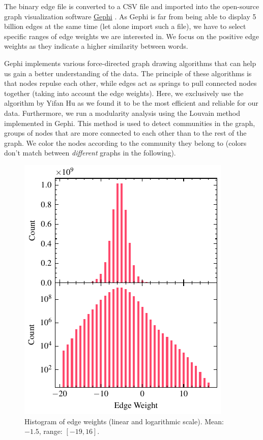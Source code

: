 The binary edge file is converted to a CSV file and imported into the open-source graph visualization software \href{https://gephi.org/}{Gephi} \cite{tools_gephi}. As Gephi is far from being able to display 5 billion edges at the same time (let alone import such a file), we have to select specific ranges of edge weights we are interested in. We focus on the positive edge weights as they indicate a higher similarity between words.

Gephi implements various force-directed graph drawing algorithms that can help us gain a better understanding of the data. The principle of these algorithms is that nodes repulse each other, while edges act as springs to pull connected nodes together (taking into account the edge weights). Here, we exclusively use the algorithm by Yifan Hu \cite{yifanhu} as we found it to be the most efficient and reliable for our data. Furthermore, we run a modularity analysis using the Louvain method \cite{louvain} implemented in Gephi. This method is used to detect communities in the graph, \ie groups of nodes that are more connected to each other than to the rest of the graph. We color the nodes according to the community they belong to (colors don't match between \textit{different} graphs in the following).

\vfill\null

\begin{figure}[H]
    \centering
    \includegraphics[width=\linewidth]{assets/edge_weights.pdf}
    \caption{Histogram of edge weights (linear and logarithmic scale). Mean: $-1.5$, range: $[-19, 16]$.}
    \label{fig:hist}
\end{figure}

